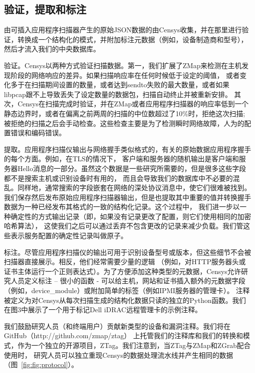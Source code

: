 \subsection{验证，提取和标注}

由可插入应用程序扫描器产生的原始JSON数据的由Censys收集，并在那里进行验证，转换成一个结构化的模式，并附加标注元数据（例如，设备制造商和型号），
然后才流入我们的中央数据库。

{\heiti 验证。}Censys以两种方式验证扫描数据。第一，我们扩展了ZMap来检测在主机发现阶段的网络响应的差异。如果扫描响应率在任何时候低于设定的阈值，
或者变化多于在扫描期间设置的数量，或者达到sendto失败的最大数量，或者如果libpcap跟不上导致丢失了设定数量的数据包，扫描自动终止并被重新安排。
其次，Censys在扫描完成时验证，并在ZMap或者应用程序扫描器的响应率低到一个静态边界时，或者在偏离之前两周的扫描的中位数超过了10\%时，拒绝这次扫描;
 被拒绝的扫描之后会手动检查。这些检查主要是为了检测瞬时网络故障，人为的配置错误和编码错误。

{\heiti 提取。}应用程序扫描仪输出与网络握手类似格式的，有关的原始数据应用程序握手的每个方面。例如，在TLS的情况下，
客户端和服务器的随机输出是客户端和服务器Hello消息的一部分。虽然这个数据是一些研究所需要的，但是很多这些字段都不是搜索主机或识别设备时有用的，
而且会导致我们的数据库中不必要的混乱。同样地，通常搜索的字段嵌套在网络的深处协议消息中，使它们很难被找到。
我们保存然后发布原始应用程序扫描器输出，但是也提取其中重要的值并转换握手数据为一种已经发布其格式的一致的结构化记录。这个过程中，
我们进一步以一种确定性的方式输出记录（即，如果没有记录更改了配置，则它们使用相同的加密哈希算法），
这使我们之后可以通过丢弃不包含更改的记录来减少负载。我们管这些表示服务配置的确定性记录叫做原子。

{\heiti 标注。}尽管应用程序扫描仪的输出可用于识别设备型号或版本，但这些细节不会被扫描器直接展示。相反，他们经常需要少量的逻辑
（例如，对HTTP服务器头或证书主体运行一个正则表达式）。为了方便添加这种类型的元数据，Censys允许研究人员定义标注 – 很小的函数 - 
可以给主机，网站和证书插入额外的元数据字段（例如，device\_module）或附加简单的标签（例如IPMI服务器的管理卡）。
注释被定义为对Censys从每次扫描生成的结构化数据只读的独立的Python函数。我们在图3中展示了一个用于标记Dell iDRAC远程管理卡的示例注释。

我们鼓励研究人员（和终端用户）贡献新类型的设备和漏洞注释。我们将在GitHub（http://github.com/zmap/ztag）
上托管我们的注释库和我们的转换和模式，作为一个独立的开源项目，ZTag。我们注意到，当ZTag与ZMap和ZGrab配合使用时，
研究人员可以独立重现Censys的数据处理流水线并产生相同的数据（图~\ref{fig:fig:protocol}）。

